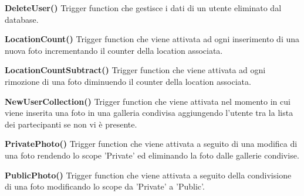 \textbf{Delete\textunderscore User()}
\break
Trigger function che gestisce i dati di un utente eliminato dal database.
\break

\textbf{Location\textunderscore Count()}
\break
Trigger function che viene attivata ad ogni inserimento di una nuova foto incrementando il counter della location associata.
\break

\textbf{Location\textunderscore Count\textunderscore Subtract()}
\break
Trigger function che viene attivata ad ogni rimozione di una foto diminuendo il counter della location associata.
\break

\textbf{NewUser\textunderscore Collection()}
\break
Trigger function che viene attivata nel momento in cui viene inserita una foto in una galleria condivisa aggiungendo l'utente tra la lista dei partecipanti se non vi è presente.
\break

\textbf{Private\textunderscore Photo()}
\break
Trigger function che viene attivata a seguito di una modifica di una foto rendendo lo scope 'Private' ed eliminando la foto dalle gallerie condivise.
\break

\textbf{Public\textunderscore Photo()}
\break
Trigger function che viene attivata a seguito della condivisione di una foto modificando lo scope da 'Private' a 'Public'.
\break



